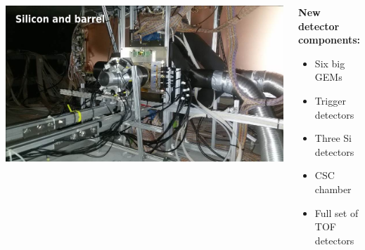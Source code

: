 \documentclass[dvipsnames] {beamer}
\begin{document}
\begin{frame}
\begin{columns}[t]
    \vskip -3.35cm
    \begin{minipage}{1.\linewidth}
      \includegraphics[width=1.\linewidth]{Si_and_Barrel.jpg}
    \end{minipage}
    {\footnotesize
       \begin{block}{\bf \centering New detector components:}
         \begin{itemize}
         \item Six big GEMs
         \item Trigger detectors
         \item Three Si detectors
         \item CSC chamber
         \item Full set of TOF detectors         
         \end{itemize}
       \end{block}
     }
  \end{columns}
\end{frame}
\end{document}
